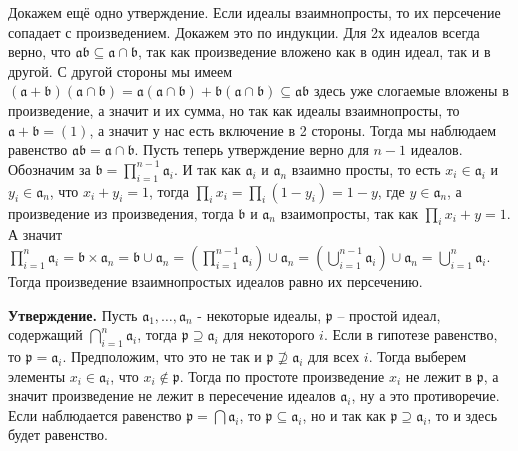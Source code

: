 \documentclass{article}
\begin{document}
\begin{enumerate}
        Докажем ещё одно утверждение. Если идеалы взаимнопросты, то их
        персечение сопадает с произведением. Докажем это по индукции. Для 2х
        идеалов всегда верно, что $\mathfrak{a}\mathfrak{b}\subseteq\mathfrak{a}
        \cap\mathfrak{b}$, так как произведение вложено как в один идеал, так и
        в другой. С другой стороны мы имеем $(\mathfrak{a}+\mathfrak{b})(\mathfrak{a}
        \cap\mathfrak{b})=\mathfrak{a}(\mathfrak{a}\cap\mathfrak{b})+\mathfrak{b}
        (\mathfrak{a}\cap\mathfrak{b})\subseteq\mathfrak{a}\mathfrak{b}$ здесь
        уже слогаемые вложены в произведение, а значит и их сумма, но так
        как идеалы взаимнопросты, то $\mathfrak{a}+\mathfrak{b}=(1)$, а значит у
        нас есть включение в 2 стороны. Тогда мы наблюдаем равенство $\mathfrak{a}
        \mathfrak{b}=\mathfrak{a}\cap\mathfrak{b}$. Пусть теперь утверждение верно
        для $n-1$ идеалов. Обозначим за $\mathfrak{b}=\prod_{i=1}^{n-1}\mathfrak{a}_i$.
        И так как $\mathfrak{a}_i$ и $\mathfrak{a}_n$ взаимно просты, то есть
        $x_i\in\mathfrak{a}_i$ и $y_i\in\mathfrak{a}_n$, что $x_i+y_i=1$, тогда
        $\prod_i x_i = \prod_i (1-y_i) = 1 - y$, где $y\in\mathfrak{a}_n$, а
        произведение из произведения, тогда $\mathfrak{b}$ и $\mathfrak{a}_n$
        взаимопросты, так как $\prod_i x_i + y = 1$. А значит $\prod_{i=1}^n
        \mathfrak{a}_i=\mathfrak{b}\times\mathfrak{a}_n=\mathfrak{b}\cup\mathfrak
        {a}_n=(\prod_{i=1}^{n-1}\mathfrak{a}_i)\cup\mathfrak{a}_n=(\bigcup_{i=1}
        ^{n-1}\mathfrak{a}_i)\cup\mathfrak{a}_n=\bigcup_{i=1}^n\mathfrak{a}_i$.
        Тогда произведение взаимнопростых идеалов равно их персечению.

        \textbf{Утверждение.} Пусть $\mathfrak{a}_1,\ldots,\mathfrak{a}_n$ - некоторые
        идеалы, $\mathfrak{p}$ – простой идеал, содержащий $\bigcap_{i=1}^n
        \mathfrak{a}_i$, тогда $\mathfrak{p}\supseteq\mathfrak{a}_i$ для некоторого
        $i$. Если в гипотезе равенство, то $\mathfrak{p}=\mathfrak{a}_i$.
        Предположим, что это не так и $\mathfrak{p}\nsupseteq\mathfrak{a}_i$ для
        всех $i$. Тогда выберем элементы $x_i\in\mathfrak{a}_i$, что $x_i\notin
        \mathfrak{p}$. Тогда по простоте произведение $x_i$ не лежит в
        $\mathfrak{p}$, а значит произведение не лежит в пересечение идеалов
        $\mathfrak{a}_i$, ну а это противоречие. Если наблюдается равенство
        $\mathfrak{p}=\bigcap\mathfrak{a}_i$, то $\mathfrak{p}\subseteq
        \mathfrak{a}_i$, но и так как $\mathfrak{p}\supseteq\mathfrak{a}_i$, то и
        здесь будет равенство.


\end{enumerate}
\end{document}
